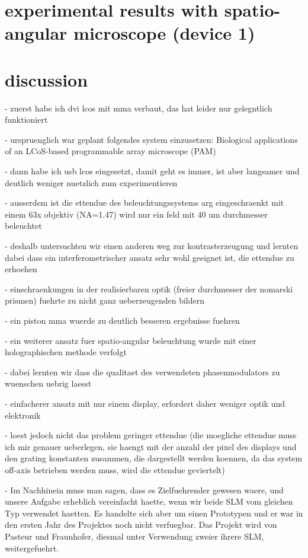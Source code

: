 \documentclass[oneside,a4paper,12pt,BCOR20mm,DIV14]{scrbook} %
\begin{document}
\chapter{experimental results with spatio-angular microscope (device 1)}
\label{sec:results}
\chapter{discussion}
\label{sec:discussion}
- zuerst habe ich dvi lcos mit mma verbaut, das hat leider nur
  gelegntlich funktioniert

- urspruenglich war geplant folgendes system einzusetzen: Biological
  applications of an LCoS-based programmable array microscope (PAM)

- dann habe ich usb lcos eingesetzt, damit geht es immer, ist aber
  langsamer und deutlich weniger nuetzlich zum experimentieren

- ausserdem ist die ettendue des beleuchtungssystems arg
  eingeschraenkt mit einem 63x objektiv (NA=1.47) wird nur ein feld
  mit 40 um durchmesser beleuchtet

- deshalb untersuchten wir einen anderen weg zur kontrasterzeugung und
  lernten dabei dass ein interferometrischer ansatz sehr wohl geeignet
  ist, die ettendue zu erhoehen

  - einschraenkungen in der realisierbaren optik (freier durchmesser
    der nomarski prismen) fuehrte zu nicht ganz ueberzeugenden bildern

  - ein piston mma wuerde zu deutlich besseren ergebnisse fuehren

- ein weiterer ansatz fuer spatio-angular beleuchtung wurde mit einer
  holographischen methode verfolgt

  - dabei lernten wir dass die qualitaet des verwendeten
    phasenmodulators zu wuenschen uebrig laesst

  - einfacherer ansatz mit nur einem display, erfordert daher weniger
    optik und elektronik

  - loest jedoch nicht das problem geringer ettendue (die moegliche
    ettendue muss ich mir genauer ueberlegen, sie haengt mit der
    anzahl der pixel des displays und den grating konstanten zusammen,
    die dargestellt werden koennen, da das system off-axis betrieben
    werden muss, wird die ettendue geviertelt)

- Im Nachhinein muss man sagen, dass es Zielfuehrender gewesen
    waere, und unsere Aufgabe erheblich vereinfacht haette, wenn wir
    beide SLM vom gleichen Typ verwendet haetten. Es handelte sich
    aber um einen Prototypen und er war in den ersten Jahr des
    Projektes noch nicht verfuegbar. Das Projekt wird von Pasteur und
    Fraunhofer, diesmal unter Verwendung zweier ihrere SLM,
    weitergefuehrt. 
\end{document}
